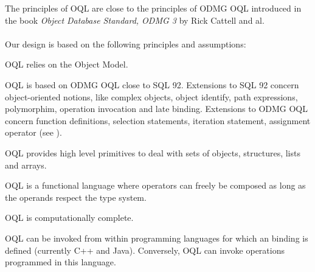 \label{principles}
The principles of OQL are close to the principles of ODMG OQL introduced
in the book \emph{Object Database Standard, ODMG 3} by Rick Cattell and al.
\\
\\
Our design is based on the following principles and assumptions:
\bi
\item OQL relies on the \eyedb Object Model.
\item OQL is based on ODMG OQL close to SQL 92. Extensions to SQL 92
concern object-oriented notions, like complex objects, object identify,
path expressions, polymorphim, operation invocation and late binding.
Extensions to ODMG OQL concern function definitions, selection statements,
iteration statement, assignment operator (see ).
\item OQL provides high level primitives to deal with sets of objects,
structures, lists and arrays.
\item OQL is a functional language where operators can freely be composed as
long as the operands respect the type system.
\item OQL is computationally complete.
\item OQL can be invoked from within programming languages for which an
\eyedb binding is defined (currently C++ and Java).
Conversely, OQL can invoke operations programmed in this language.
\ei

